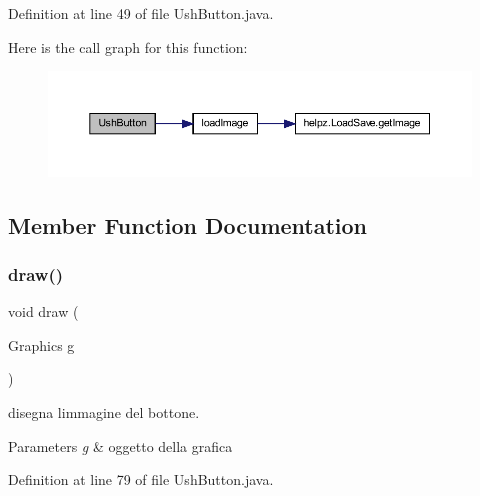 Definition at line 49 of file Ush\+Button.\+java.

Here is the call graph for this function\+:
\nopagebreak
\begin{figure}[H]
\begin{center}
\leavevmode
\includegraphics[width=350pt]{classui_1_1_ush_button_a897b1e73322d3db9ffb350034fbff99e_cgraph}
\end{center}
\end{figure}


\subsection{Member Function Documentation}
\mbox{\label{classui_1_1_ush_button_a72fe1ffca978e99fd16994a10e7f8051}} 
\subsubsection{\texorpdfstring{draw()}{draw()}}
{\footnotesize\ttfamily void draw (\begin{DoxyParamCaption}\item[{Graphics}]{g }\end{DoxyParamCaption})}



disegna l\textquotesingle{}immagine del bottone. 


\begin{DoxyParams}{Parameters}
{\em g} & oggetto della grafica \\
\hline
\end{DoxyParams}


Definition at line 79 of file Ush\+Button.\+java.

